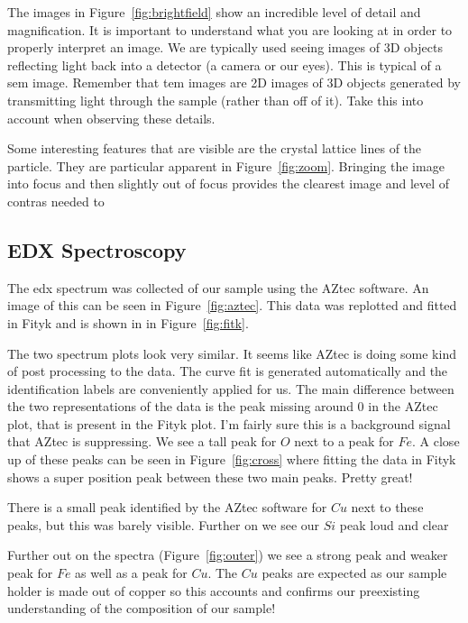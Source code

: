 \documentclass[12pt,a4paper]{article}
\begin{document}
The images in Figure~\ref{fig:brightfield} show an incredible level of detail and magnification.  It is important to understand what you are looking at in order to properly interpret an image.  We are typically used seeing images of 3D objects reflecting light back into a detector (a camera or our eyes).  This is typical of a \ac{sem} image.  Remember that \ac{tem} images are 2D images of 3D objects generated by transmitting light through the sample (rather than off of it).  Take this into account when observing these details.

Some interesting features that are visible are the crystal lattice lines of the particle.  They are particular apparent in Figure~\ref{fig:zoom}.  Bringing the image into focus and then slightly out of focus provides the clearest image and level of contras needed to 


\subsection{EDX Spectroscopy} %
\label{sub:edx_spectroscopy}

The \ac{edx} spectrum was collected of our sample using the AZtec software.  An image of this can be seen in Figure~\ref{fig:aztec}.  This data was replotted and fitted in Fityk and is shown in in Figure~\ref{fig:fitk}.  

The two spectrum plots look very similar.  It seems like AZtec is doing some kind of post processing to the data.  The curve fit is generated automatically and the identification labels are conveniently applied for us.  The main difference between the two representations of the data is the peak missing around 0 in the AZtec plot, that is present in the Fityk plot.  I'm fairly sure this is a background signal that AZtec is suppressing.  We see a tall peak for $O$ next to a peak for $Fe$.  A close up of these peaks can be seen in Figure~\ref{fig:cross} where fitting the data in Fityk shows a super position peak between these two main peaks.  Pretty great!  

There is a small peak identified by the AZtec software for $Cu$ next to these peaks, but this was barely visible.  Further on we see our $Si$ peak loud and clear

Further out on the spectra (Figure~\ref{fig:outer}) we see a strong peak and weaker peak for $Fe$ as well as a peak for $Cu$.  The $Cu$ peaks are expected as our sample holder is made out of copper so this accounts and confirms our preexisting understanding of the composition of our sample!
\end{document}
